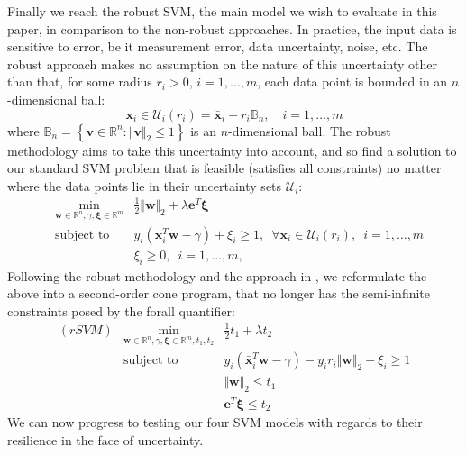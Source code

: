 \documentclass[11pt]{article}
\newcommand{\ds}{\displaystyle}
\begin{document}
Finally we reach the robust SVM, the main model we wish to evaluate in this paper, in comparison to the non-robust approaches. In practice, the input data is sensitive to error, be it measurement error, data uncertainty, noise, etc. The robust approach makes no assumption on the nature of this uncertainty other than that, for some radius $r_i>0$, $i=1,\dots,m$, each data point is bounded in an $n$-dimensional ball:
\[
\bm{x}_i\in\mathcal{U}_i(r_i) = \bar{\bm{x}}_i + r_i\mathbb{B}_n, \quad i=1,\dots,m
\]
where $\mathbb{B}_n = \left\{\bm{v}\in\mathbb{R}^n : \Vert \bm{v}\Vert_2\leq 1\right\}$ is an $n$-dimensional ball. The robust methodology aims to take this uncertainty into account, and so find a solution to our standard SVM problem that is feasible (satisfies all constraints) no matter where the data points lie in their uncertainty sets $\mathcal{U}_i$:
\begin{eqnarray*}
& \ds\min_{\bm{w}\in\mathbb{R}^n, \gamma, \bm{\xi}\in\mathbb{R}^m} & \frac{1}{2}\Vert \bm{w} \Vert_2 + \lambda\bm{e}^T\bm{\xi}
\\
& \mbox{subject to } & y_i(\bm{x}_i^T\bm{w} - \gamma) + \xi_i \geq 1, \enspace \forall \bm{x}_i\in\mathcal{U}_i(r_i),\enspace i=1,\dots,m
\\
& & \xi_i \geq 0, \enspace i=1,\dots,m, 
\end{eqnarray*}
Following the robust methodology and the approach in \cite{rsvm}, we reformulate the above into a second-order cone program, that no longer has the semi-infinite constraints posed by the forall quantifier:
\begin{eqnarray*}
(rSVM) & \ds\min_{\bm{w}\in\mathbb{R}^n, \gamma, \bm{\xi}\in\mathbb{R}^m, t_1, t_2} & \frac{1}{2}t_1 + \lambda t_2
\\
& \mbox{subject to } & y_i\left(\bar{\bm{x}}_i^T\bm{w}-\gamma\right) - y_ir_i\Vert\bm{w}\Vert_2 + \xi_i \geq 1
\\
& & \Vert \bm{w} \Vert_2 \leq t_1
\\
& & \bm{e}^T\bm{\xi} \leq t_2
\end{eqnarray*}
We can now progress to testing our four SVM models with regards to their resilience in the face of uncertainty. 
\end{document}
